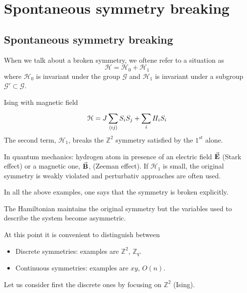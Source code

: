\documentclass[../main/main.tex]{subfiles}
\begin{document}
\chapter{Spontaneous symmetry breaking}


\section{Spontaneous symmetry breaking}

When we talk about a broken symmetry, we oftene refer to a situation as
\begin{equation}
  \mathcal{H} = \mathcal{H}_0 + \mathcal{H}_1
\end{equation}
where \( \mathcal{H}_0 \)  is invariant under the group \( \mathcal{G} \) and \( \mathcal{H}_1 \) is invariant under a subgroup \( \mathcal{G}' \subset  \mathcal{G}\).
\begin{example}{Ising with magnetic field}{}
\begin{equation}
  \mathcal{H} = J \sum_{\expval{ij} }^{} S_i S_j + \sum_{i}^{} H_i S_i
\end{equation}
The second term, \( \mathcal{H}_1 \), breaks the \( \mathbb{Z}^2 \) symmetry satisfied by the \( 1^{st} \) alone.
\end{example}
\begin{example}{}{}
In quantum mechanics: hydrogen atom in presence of an electric field \( \va{E} \) (Stark effect) or a magnetic one, \( \va{B} \), (Zeeman effect). If \( \mathcal{H}_1 \) is small, the original symmetry is weakly violated and perturbativ approaches are often used.
\end{example}

In all the above examples, one says that the symmetry is broken explicitly.

\begin{definition}
The Hamiltonian maintains the original symmetry but the variables used to describe the system become asymmetric.
\end{definition}
At this point it is convenient to distinguish between
\begin{itemize}
\item Discrete symmetries: examples are \( \mathbb{Z}^2 \), \( \mathbb{Z}_q \).
\item Continuous symmetries: examples are \( xy \), \( O(n) \).
\end{itemize}
Let us consider first the discrete ones by focusing on \( \mathbb{Z}^2 \) (Ising).
\end{document}

